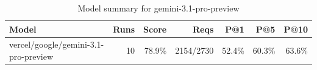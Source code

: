 \begin{table}[htbp]
\centering
\begin{tabular}{lrrrrrr}
\toprule
Model & Runs & Score & Reqs & P@1 & P@5 & P@10 \\
\midrule
vercel/google/gemini-3.1-pro-preview & 10 & 78.9\% & 2154/2730 & 52.4\% & 60.3\% & 63.6\% \\
\bottomrule
\end{tabular}
\caption{Model summary for gemini-3.1-pro-preview}
\end{table}
